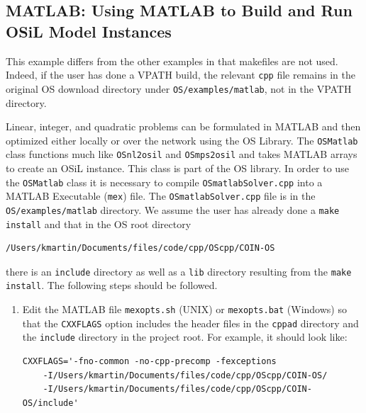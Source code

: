 \documentclass[11pt]{article}
\renewcommand{\_}{{\char"5F}}
\renewcommand{\{}{{\char"7B}}
\renewcommand{\}}{{\char"7D}}
\renewcommand{\^}{{\char"0D}}
\renewcommand{\'}{{\char"0D}}
\begin{document}
\begin{enumerate}[Step 1:]



\subsection{MATLAB:  Using MATLAB to Build and Run OSiL Model Instances}\label{section:usingmatlab}

This example differs from the other examples in that makefiles are not used.
Indeed, if the user has done a VPATH build, the relevant {\tt cpp} file remains
in the original OS download directory under {\tt OS/examples/matlab},
not in the VPATH directory.




Linear, integer, and quadratic problems can be formulated in MATLAB and then optimized
either locally or over the network using the OS Library. The {\tt OSMatlab} class functions much like
{\tt OSnl2osil} and {\tt OSmps2osil}
and takes MATLAB arrays to create an OSiL instance.  This class is part of the OS library.
In order to use the {\tt OSMatlab} class it is necessary to  compile
{\tt OSmatlabSolver.cpp}  into  a MATLAB Executable ({\tt mex}) file.
The {\tt OSmatlabSolver.cpp} file is in the {\tt  OS/examples/matlab} directory.
We  assume the user has already done a {\tt make install} and that in the OS root directory
\begin{verbatim}
/Users/kmartin/Documents/files/code/cpp/OScpp/COIN-OS
\end{verbatim}
there is an {\tt include} directory as well as a {\tt lib} directory resulting from the {\tt make install}.
The following steps should be followed.


\begin{enumerate}[{\bf Step 1:}]



\item{} Edit the MATLAB file {\tt mexopts.sh} (UNIX) or {\tt mexopts.bat}  (Windows) so that the {\tt CXXFLAGS} option includes the header files in the {\tt cppad} directory and the {\tt include} directory in the project root. For example, it  should look like:
\begin{verbatim}
CXXFLAGS='-fno-common -no-cpp-precomp -fexceptions
    -I/Users/kmartin/Documents/files/code/cpp/OScpp/COIN-OS/
    -I/Users/kmartin/Documents/files/code/cpp/OScpp/COIN-OS/include'
\end{verbatim}


\end{enumerate}
\end{enumerate}
\end{document}
